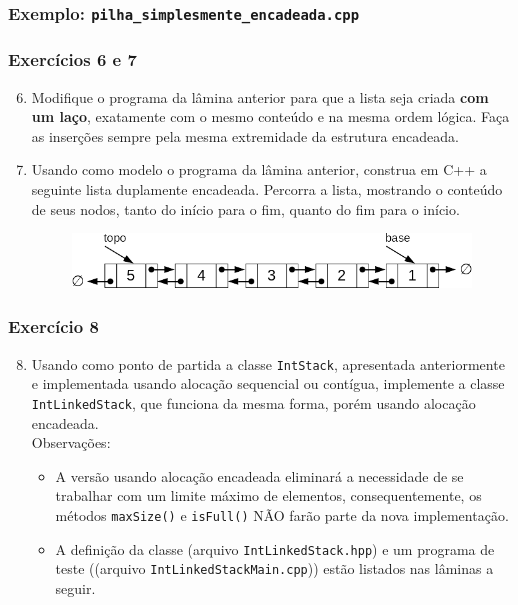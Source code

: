 \documentclass[aspectratio=169]{beamer}
\begin{document}
\begin{frame}[fragile]\frametitle{Exemplo: \texttt{pilha\_simplesmente\_encadeada.cpp}}
\fontsize{5pt}{5pt}\selectfont{

}
\end{frame}

\begin{frame}[fragile]\frametitle{Exercícios 6 e 7}
\begin{enumerate}
        \setcounter{enumi}{5}
	\item Modifique o programa da lâmina anterior para que a lista seja criada \textbf{com um laço}, exatamente com o mesmo conteúdo e na mesma ordem lógica. Faça as inserções sempre pela mesma extremidade da estrutura encadeada.
	\item Usando como modelo o programa da lâmina anterior, construa em C++ a seguinte lista duplamente encadeada. Percorra a lista, mostrando o conteúdo de seus nodos, tanto do início para o fim, quanto do fim para o início.	
\begin{figure}[h]
	\centering
	\includegraphics[height=0.16\paperheight]{imagens/pilha_duplamente_encadeada.png}
\end{figure}
\end{enumerate}
\end{frame}

\begin{frame}[fragile]\frametitle{Exercício 8}
\begin{enumerate}
        \setcounter{enumi}{7}
	\item Usando como ponto de partida a classe \texttt{IntStack}, apresentada anteriormente e implementada usando alocação sequencial ou contígua, implemente a classe \texttt{IntLinkedStack}, que funciona da mesma forma, porém usando alocação encadeada.\\
	Observações:
	\begin{itemize}
		\item A versão usando alocação encadeada eliminará a necessidade de se trabalhar com um limite máximo de elementos, consequentemente, os métodos \texttt{maxSize()} e \texttt{isFull()} NÃO farão parte da nova implementação.
		\item A definição da classe (arquivo \texttt{IntLinkedStack.hpp}) e um programa de teste ((arquivo \texttt{IntLinkedStackMain.cpp})) estão listados nas lâminas a seguir.
	\end{itemize}
\end{enumerate}
\end{frame}
\end{document}
